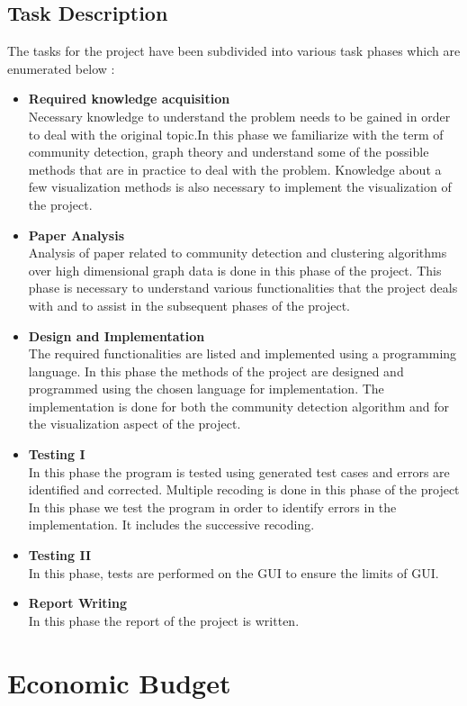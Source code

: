 \subsection{Task Description}
The tasks for the project have been subdivided into various task phases which are enumerated below : 
\begin{itemize}
\item \textbf{Required knowledge acquisition}\\
Necessary knowledge to understand the problem needs to be gained in order to deal with the original topic.In this phase we familiarize with the term of community detection, graph theory and understand some of the possible methods that are in practice to deal with the problem. Knowledge about a few visualization methods is also necessary to implement the visualization of the project.
\item \textbf{Paper Analysis}\\ 
Analysis of paper related to community detection and clustering algorithms over high dimensional graph data is done in this phase of the project. This phase is necessary to understand various functionalities that the project deals with and to assist in the subsequent phases of the project.
\item \textbf{Design and Implementation} \\
The required functionalities are listed and implemented using a programming language. In this phase the methods of the project are designed and programmed using the chosen language for implementation. 
The implementation is done for both the community detection algorithm and for the visualization aspect of the project.
\item \textbf{Testing I}\\
In this phase the program is tested using generated test cases and errors are identified and corrected. Multiple recoding is done in this phase of the project
In this phase we test the program in order to identify errors in
the implementation. It includes the successive recoding.
\item \textbf{Testing II}\\
In this phase, tests are performed on the GUI to ensure the limits of GUI. 
\item \textbf{Report Writing}\\
In this phase the report of the project is written.
\end{itemize} 
\section{Economic Budget}
